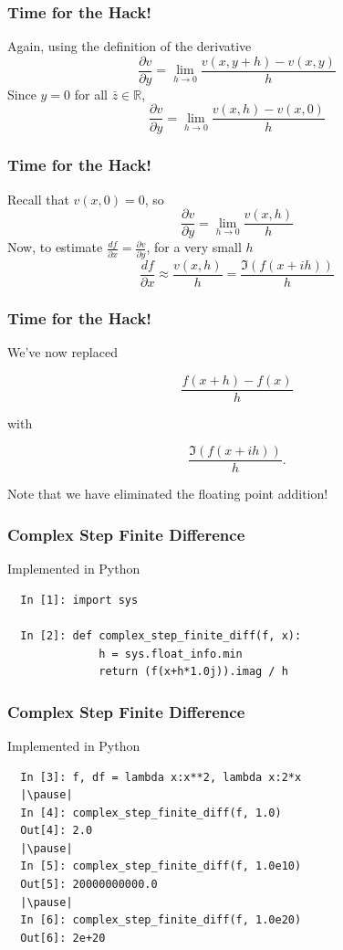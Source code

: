 \documentclass{beamer}
\def\R{\mathbb{R}}                     %
\begin{document}
\begin{frame}
\frametitle{Time for the Hack!}

  Again, using the definition of the derivative
  \[ \frac{\partial v}{\partial y} = \lim_{h \to 0} \frac{v(x,y+h) - v(x,y)}{h} \]
  \pause
  Since $y = 0$ for all $\bar{z} \in \R$,
  \[ \frac{\partial v}{\partial y} = \lim_{h \to 0} \frac{v(x,h) - v(x,0)}{h} \]

\end{frame}

\begin{frame}
\frametitle{Time for the Hack!}

  Recall that $v(x,0) = 0$, so
  \[ \frac{\partial v}{\partial y} = \lim_{h \to 0} \frac{v(x,h)}{h} \]
  \pause
  Now, to estimate $\frac{df}{\partial x} = \frac{\partial v}{\partial y}$, for a very small $h$
  \[ \frac{df}{\partial x} \approx \frac{v(x,h)}{h} = \frac{\mathfrak{I}(f(x+ih))}{h} \]


\end{frame}

\begin{frame}
\frametitle{Time for the Hack!}

  We've now replaced

  \[ \frac{f(x+h) - f(x)}{h} \]

  with

  \[ \frac{\mathfrak{I}(f(x+ih))}{h}. \]

  Note that we have eliminated the floating point addition!


\end{frame}


\begin{frame}[fragile]
\frametitle{Complex Step Finite Difference}

Implemented in Python


\begin{lstlisting}
  In [1]: import sys

  In [2]: def complex_step_finite_diff(f, x):
              h = sys.float_info.min
              return (f(x+h*1.0j)).imag / h
\end{lstlisting}
\end{frame}

\begin{frame}[fragile]
\frametitle{Complex Step Finite Difference}

Implemented in Python


\begin{lstlisting}
  In [3]: f, df = lambda x:x**2, lambda x:2*x
  |\pause|
  In [4]: complex_step_finite_diff(f, 1.0)
  Out[4]: 2.0
  |\pause|
  In [5]: complex_step_finite_diff(f, 1.0e10)
  Out[5]: 20000000000.0
  |\pause|
  In [6]: complex_step_finite_diff(f, 1.0e20)
  Out[6]: 2e+20


\end{lstlisting}
\end{frame}
\end{document}
